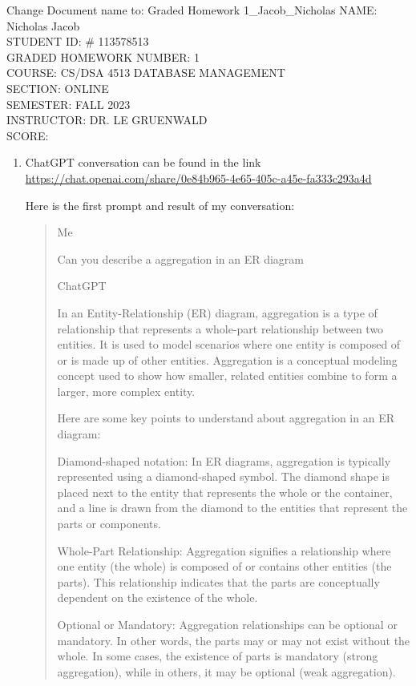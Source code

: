 \documentclass[11pt]{article}
\author{}
\title{}
\begin{document}
{\Large
Change Document name to: Graded Homework 1\_Jacob\_Nicholas
\noindent NAME:  Nicholas Jacob\\ 
STUDENT ID: \# 113578513\\
GRADED HOMEWORK NUMBER: 1\\
COURSE: CS/DSA 4513 DATABASE MANAGEMENT\\ 
SECTION: ONLINE\\SEMESTER: FALL 2023\\
INSTRUCTOR:  DR. LE GRUENWALD\\
 SCORE:}

\newpage
\begin{enumerate}
\item ChatGPT conversation can be found in the link  \url{https://chat.openai.com/share/0e84b965-4e65-405c-a45e-fa333c293a4d}

Here is the first prompt and result of my conversation:

\begin{quotation}
\noindent Me

Can you describe a aggregation in an ER diagram


\noindent ChatGPT

In an Entity-Relationship (ER) diagram, aggregation is a type of relationship that represents a whole-part relationship between two entities. It is used to model scenarios where one entity is composed of or is made up of other entities. Aggregation is a conceptual modeling concept used to show how smaller, related entities combine to form a larger, more complex entity.

Here are some key points to understand about aggregation in an ER diagram:

    Diamond-shaped notation: In ER diagrams, aggregation is typically represented using a diamond-shaped symbol. The diamond shape is placed next to the entity that represents the whole or the container, and a line is drawn from the diamond to the entities that represent the parts or components.

    Whole-Part Relationship: Aggregation signifies a relationship where one entity (the whole) is composed of or contains other entities (the parts). This relationship indicates that the parts are conceptually dependent on the existence of the whole.

    Optional or Mandatory: Aggregation relationships can be optional or mandatory. In other words, the parts may or may not exist without the whole. In some cases, the existence of parts is mandatory (strong aggregation), while in others, it may be optional (weak aggregation).


\end{quotation}
\end{enumerate}
\end{document}
